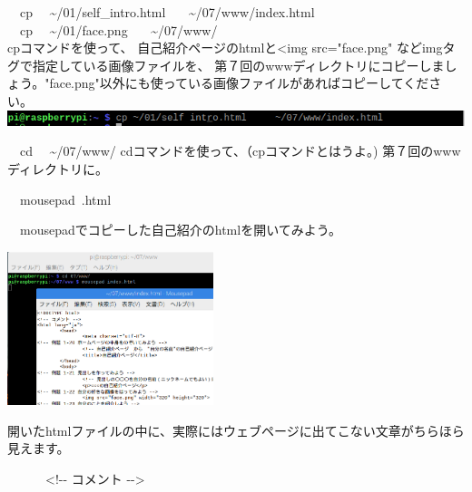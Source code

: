\documentclass[a4paper,12pt,dvipdfmx]{jarticle}
\begin{document}
\begin{minipage}[b]{0.5\textwidth}
	\begin{enumerate}
		\begin{minipage}[b]{1.5\textwidth}
			\item \ \ cp \ \ {\textasciitilde}/01/self\_intro.html \ \ \ {\textasciitilde}/07/www/index.html\\
			\ \ cp \ \ {\textasciitilde}/01/face.png \ \ \ {\textasciitilde}/07/www/\\
			cpコマンドを使って、 自己紹介ページのhtmlと<img src="face.png" などimgタグで指定している画像ファイルを、 第７回のwwwディレクトリにコピーしましょう。"face.png"以外にも使っている画像ファイルがあればコピーしてください。\\
			\includegraphics[width=14.73cm]{ome7-img033.png}
			\bigskip
		\end{minipage}

		\bigskip

		\item

		      \ \ cd \ \ {\textasciitilde}/07/www/\newline
		      cdコマンドを使って、（cpコマンドとはうよ。) 第７回のwwwディレクトリに。


		\item \ \ mousepad\ \index.html

		      \ \ mousepadでコピーした自己紹介のhtmlを開いてみよう。

	\end{enumerate}
\end{minipage}
\includegraphics[width=0.45\textwidth]{ome7-img034.png}

\bigskip

開いたhtmlファイルの中に、実際にはウェブページに出てこない文章がちらほら見えます。

\ \ \ \ \ \ {\textless}!-{}- コメント -{}-{\textgreater}
\end{document}
